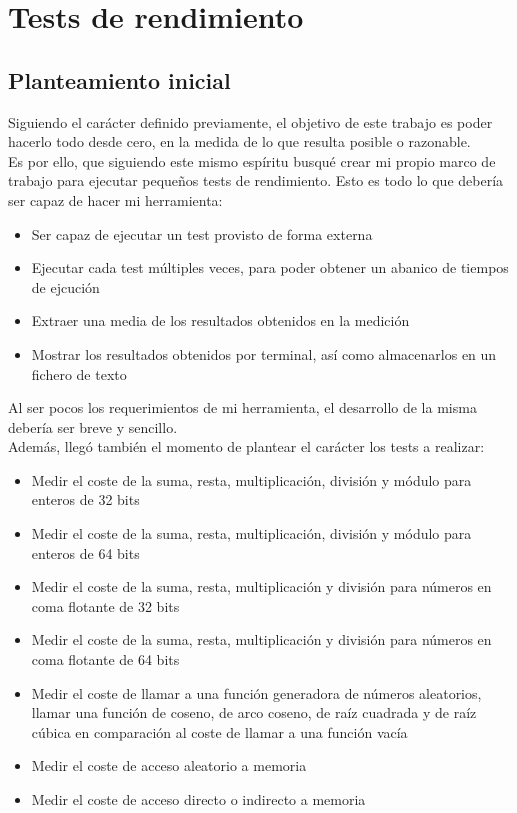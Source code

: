 \chapter{Tests de rendimiento}

\section{Planteamiento inicial}

Siguiendo el carácter definido previamente, el objetivo de este trabajo es poder hacerlo todo desde cero, en la medida de lo que resulta posible o razonable.\\

Es por ello, que siguiendo este mismo espíritu busqué crear mi propio marco de trabajo para ejecutar pequeños tests de rendimiento. Esto es todo lo que debería ser capaz de hacer mi herramienta:

\begin{itemize}
	\item Ser capaz de ejecutar un test provisto de forma externa
	\item Ejecutar cada test múltiples veces, para poder obtener un abanico de tiempos de ejcución
	\item Extraer una media de los resultados obtenidos en la medición
	\item Mostrar los resultados obtenidos por terminal, así como almacenarlos en un fichero de texto
\end{itemize}

Al ser pocos los requerimientos de mi herramienta, el desarrollo de la misma debería ser breve y sencillo.\\

Además, llegó también el momento de plantear el carácter los tests a realizar:

\begin{itemize}
	\item Medir el coste de la suma, resta, multiplicación, división y módulo para enteros de 32 bits
	\item Medir el coste de la suma, resta, multiplicación, división y módulo para enteros de 64 bits
	\item Medir el coste de la suma, resta, multiplicación y división para números en coma flotante de 32 bits
	\item Medir el coste de la suma, resta, multiplicación y división para números en coma flotante de 64 bits
	\item Medir el coste de llamar a una función generadora de números aleatorios, llamar una función de coseno, de arco coseno, de raíz cuadrada y de raíz cúbica en comparación al coste de llamar a una función vacía
	\item Medir el coste de acceso aleatorio a memoria
	\item Medir el coste de acceso directo o indirecto a memoria
\end{itemize}

